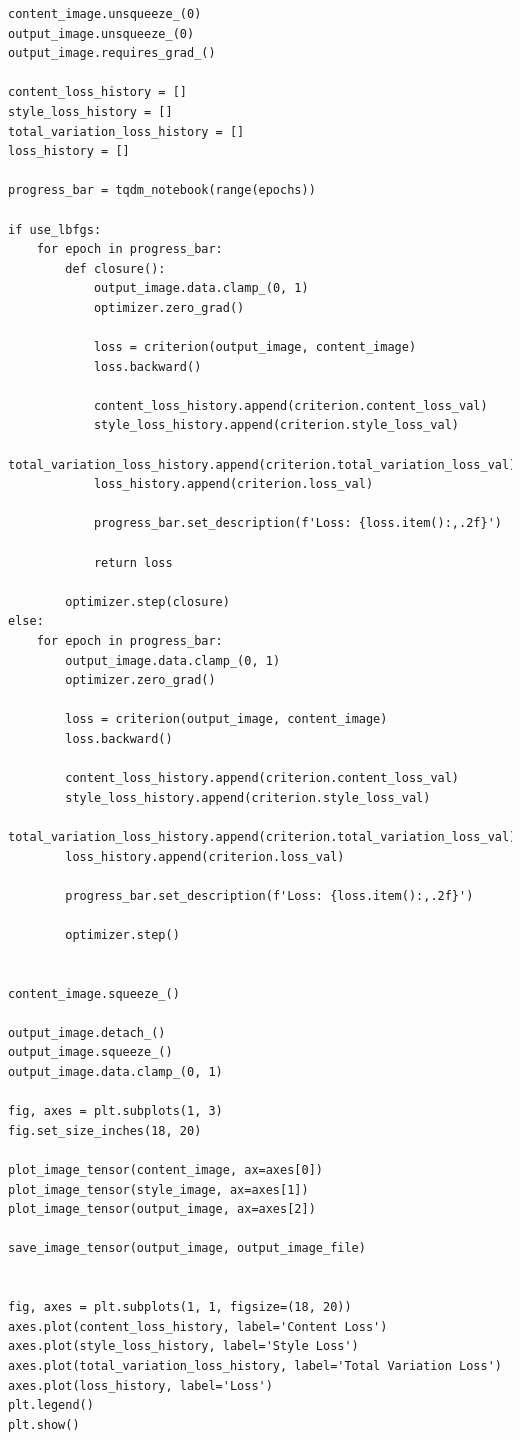 \begin{longlisting}
\begin{verbatim}
content_image.unsqueeze_(0)
output_image.unsqueeze_(0)
output_image.requires_grad_()

content_loss_history = []
style_loss_history = []
total_variation_loss_history = []
loss_history = []

progress_bar = tqdm_notebook(range(epochs))

if use_lbfgs:
    for epoch in progress_bar:
        def closure():
            output_image.data.clamp_(0, 1)
            optimizer.zero_grad()

            loss = criterion(output_image, content_image)
            loss.backward()
            
            content_loss_history.append(criterion.content_loss_val)
            style_loss_history.append(criterion.style_loss_val)
            total_variation_loss_history.append(criterion.total_variation_loss_val)
            loss_history.append(criterion.loss_val)

            progress_bar.set_description(f'Loss: {loss.item():,.2f}')

            return loss

        optimizer.step(closure)
else:
    for epoch in progress_bar:
        output_image.data.clamp_(0, 1)
        optimizer.zero_grad()

        loss = criterion(output_image, content_image)
        loss.backward()
        
        content_loss_history.append(criterion.content_loss_val)
        style_loss_history.append(criterion.style_loss_val)
        total_variation_loss_history.append(criterion.total_variation_loss_val)
        loss_history.append(criterion.loss_val)

        progress_bar.set_description(f'Loss: {loss.item():,.2f}')

        optimizer.step()


content_image.squeeze_()

output_image.detach_()
output_image.squeeze_()
output_image.data.clamp_(0, 1)

fig, axes = plt.subplots(1, 3)
fig.set_size_inches(18, 20)

plot_image_tensor(content_image, ax=axes[0])
plot_image_tensor(style_image, ax=axes[1])
plot_image_tensor(output_image, ax=axes[2])

save_image_tensor(output_image, output_image_file)


fig, axes = plt.subplots(1, 1, figsize=(18, 20))  
axes.plot(content_loss_history, label='Content Loss')
axes.plot(style_loss_history, label='Style Loss')
axes.plot(total_variation_loss_history, label='Total Variation Loss')
axes.plot(loss_history, label='Loss')
plt.legend()
plt.show()
\end{verbatim}
\label{lst:notebook_neural_style_transfer}
\end{longlisting}



